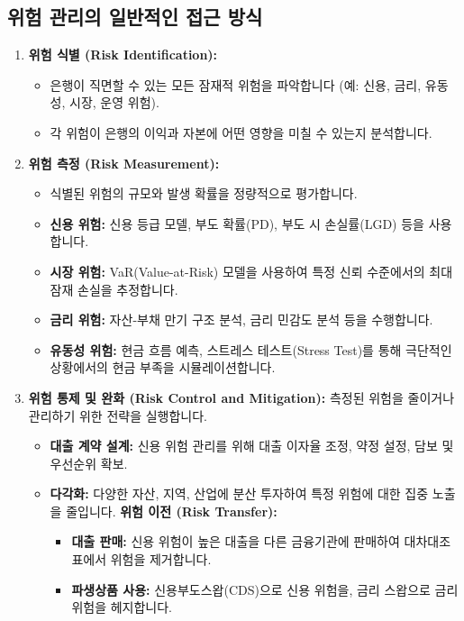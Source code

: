 \documentclass[11pt,a4paper]{book}
\theoremstyle{definition}
\begin{document}
\subsection{위험 관리의 일반적인 접근 방식}
\begin{enumerate}
    \item \textbf{위험 식별 (Risk Identification):}
        \begin{itemize}
            \item 은행이 직면할 수 있는 모든 잠재적 위험을 파악합니다 (예: 신용, 금리, 유동성, 시장, 운영 위험).
            \item 각 위험이 은행의 이익과 자본에 어떤 영향을 미칠 수 있는지 분석합니다.
        \end{itemize}
    \item \textbf{위험 측정 (Risk Measurement):}
        \begin{itemize}
            \item 식별된 위험의 규모와 발생 확률을 정량적으로 평가합니다.
            \item \textbf{신용 위험:} 신용 등급 모델, 부도 확률(PD), 부도 시 손실률(LGD) 등을 사용합니다.
            \item \textbf{시장 위험:} VaR(Value-at-Risk) 모델을 사용하여 특정 신뢰 수준에서의 최대 잠재 손실을 추정합니다.
            \item \textbf{금리 위험:} 자산-부채 만기 구조 분석, 금리 민감도 분석 등을 수행합니다.
            \item \textbf{유동성 위험:} 현금 흐름 예측, 스트레스 테스트(Stress Test)를 통해 극단적인 상황에서의 현금 부족을 시뮬레이션합니다.
        \end{itemize}
    \item \textbf{위험 통제 및 완화 (Risk Control and Mitigation):}
        측정된 위험을 줄이거나 관리하기 위한 전략을 실행합니다.
        \begin{itemize}
            \item \textbf{대출 계약 설계:} 신용 위험 관리를 위해 대출 이자율 조정, 약정 설정, 담보 및 우선순위 확보.
            \item \textbf{다각화:} 다양한 자산, 지역, 산업에 분산 투자하여 특정 위험에 대한 집중 노출을 줄입니다.
            \textbf{위험 이전 (Risk Transfer):}
                \begin{itemize}
                    \item \textbf{대출 판매:} 신용 위험이 높은 대출을 다른 금융기관에 판매하여 대차대조표에서 위험을 제거합니다.
                    \item \textbf{파생상품 사용:} 신용부도스왑(CDS)으로 신용 위험을, 금리 스왑으로 금리 위험을 헤지합니다.

\end{itemize}
\end{itemize}
\end{enumerate}
\end{document}
